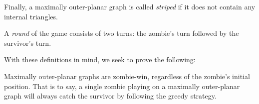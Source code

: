 \documentclass[letterpaper, 10pt]{article}
\begin{document}
\begin{definition}
Finally, a maximally outer-planar graph is called \emph{striped} if it does not
contain any internal triangles.
\end{definition}

\begin{definition}
A \emph{round} of the game consists of two turns: the zombie's turn followed by the survivor's turn.
\end{definition}

With these definitions in mind, we seek to prove the following:

\begin{theorem}
Maximally outer-planar graphs are zombie-win, regardless of the zombie's initial position.
That is to say, a single zombie
playing on a maximally outer-planar graph will always catch the survivor by following
the greedy strategy.
\end{theorem}
\end{document}
